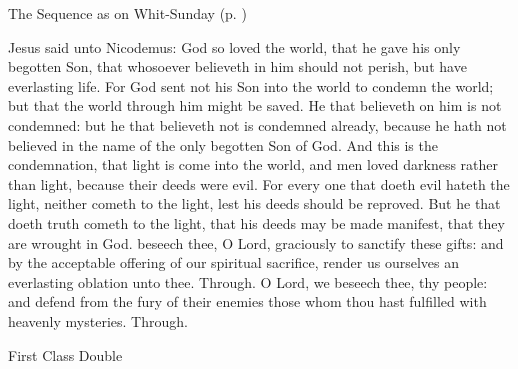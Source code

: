 \begin{rubric}
{The Sequence as on Whit-Sunday (p. \pageref{WhitSeq})}
\end{rubric}
 Jesus said unto Nicodemus: God so loved the world, that he gave his only begotten Son, that whosoever believeth in him should not perish, but have everlasting life. For God sent not his Son into the world to condemn the world; but that the world through him might be saved. He that believeth on him is not condemned: but he that believeth not is condemned already, because he hath not believed in the name of the only begotten Son of God. And this is the condemnation, that light is come into the world, and men loved darkness rather than light, because their deeds were evil. For every one that doeth evil hateth the light, neither cometh to the light, lest his deeds should be reproved. But he that doeth truth cometh to the light, that his deeds may be made manifest, that they are wrought in God.
\secret
{} beseech thee, O Lord, graciously to sanctify these gifts: and by the acceptable offering of our spiritual sacrifice, render us ourselves an everlasting oblation unto thee. Through.
\postcommunion
{} O Lord, we beseech thee, thy people: and defend from the fury of their enemies those whom thou hast fulfilled with heavenly mysteries. Through.

\begin{inhead}
    {First Class Double}
\end{inhead}
\par\noindent
{}


\properantiphonfix

